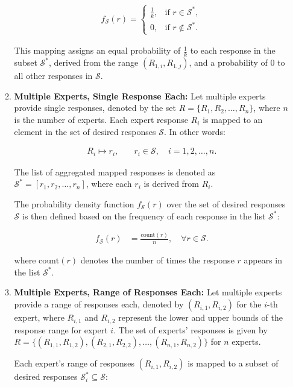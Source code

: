 \begin{enumerate}
\begin{definition}
\begin{enumerate}
\begin{align*}
f_{\mathcal{S}}(r) = 
\begin{cases}
\frac{1}{k}, & \text{if } r \in \mathcal{S}^*, \\
0, & \text{if } r \notin \mathcal{S}^*.
\end{cases}
\end{align*}


This mapping assigns an equal probability of $\frac{1}{k}$ to each response in the subset $\mathcal{S}^*$, derived from the range $(R_{1,i}, R_{1,j})$, and a probability of 0 to all other responses in $\mathcal{S}$.


    \item \textbf{Multiple Experts, Single Response Each:} Let multiple experts provide single responses, denoted by the set $R = \{R_1, R_2, \ldots, R_n\}$, where $n$ is the number of experts. Each expert response $R_i$ is mapped to an element in the set of desired responses $\mathcal{S}$. In other words:

\begin{align*}
R_i \mapsto r_i, \quad & r_i \in \mathcal{S}, \quad i = 1, 2, \ldots, n.
\end{align*}


The list of aggregated mapped responses is denoted as $\mathcal{S}^* = [r_1, r_2, \ldots, r_n]$, where each $r_i$ is derived from $R_i$.

The probability density function $f_{\mathcal{S}}(r)$ over the set of desired responses $\mathcal{S}$ is then defined based on the frequency of each response in the list $\mathcal{S}^*$:

\begin{align*}
f_{\mathcal{S}}(r) &= \frac{\text{count}(r)}{n}, \quad \forall r \in \mathcal{S}.
\end{align*}


where $\text{count}(r)$ denotes the number of times the response $r$ appears in the list $\mathcal{S}^*$. 



\item \textbf{Multiple Experts, Range of Responses Each:} Let multiple experts provide a range of responses each, denoted by $(R_{i,1}, R_{i,2})$ for the $i$-th expert, where $R_{i,1}$ and $R_{i,2}$ represent the lower and upper bounds of the response range for expert $i$. The set of experts' responses is given by $R = \{(R_{1,1}, R_{1,2}), (R_{2,1}, R_{2,2}), \ldots, (R_{n,1}, R_{n,2})\}$ for $n$ experts.

Each expert's range of responses $(R_{i,1}, R_{i,2})$ is mapped to a subset of desired responses $\mathcal{S}_i^* \subseteq \mathcal{S}$:


\end{enumerate}
\end{definition}
\end{enumerate}
